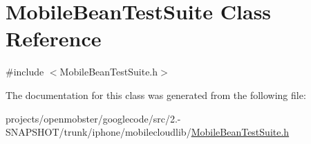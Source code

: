 \hypertarget{interface_mobile_bean_test_suite}{
\section{\-Mobile\-Bean\-Test\-Suite \-Class \-Reference}
\label{interface_mobile_bean_test_suite}
}


{\ttfamily \#include $<$\-Mobile\-Bean\-Test\-Suite.\-h$>$}



\-The documentation for this class was generated from the following file\-:\begin{DoxyCompactItemize}
\item 
projects/openmobster/googlecode/src/2.-\/\-S\-N\-A\-P\-S\-H\-O\-T/trunk/iphone/mobilecloudlib/\hyperlink{_mobile_bean_test_suite_8h}{\-Mobile\-Bean\-Test\-Suite.\-h}\end{DoxyCompactItemize}
